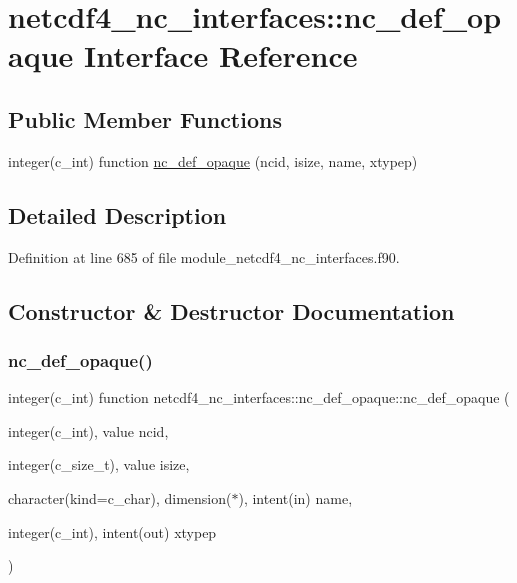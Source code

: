 \hypertarget{interfacenetcdf4__nc__interfaces_1_1nc__def__opaque}{}\section{netcdf4\+\_\+nc\+\_\+interfaces\+:\+:nc\+\_\+def\+\_\+opaque Interface Reference}
\label{interfacenetcdf4__nc__interfaces_1_1nc__def__opaque}
\subsection*{Public Member Functions}
\begin{DoxyCompactItemize}
\item 
integer(c\+\_\+int) function \hyperlink{interfacenetcdf4__nc__interfaces_1_1nc__def__opaque_aabdad01644937db10d68b7c102fb4693}{nc\+\_\+def\+\_\+opaque} (ncid, isize, name, xtypep)
\end{DoxyCompactItemize}


\subsection{Detailed Description}


Definition at line 685 of file module\+\_\+netcdf4\+\_\+nc\+\_\+interfaces.\+f90.



\subsection{Constructor \& Destructor Documentation}
\mbox{\label{interfacenetcdf4__nc__interfaces_1_1nc__def__opaque_aabdad01644937db10d68b7c102fb4693}} 
\subsubsection{\texorpdfstring{nc\+\_\+def\+\_\+opaque()}{nc\_def\_opaque()}}
{\footnotesize\ttfamily integer(c\+\_\+int) function netcdf4\+\_\+nc\+\_\+interfaces\+::nc\+\_\+def\+\_\+opaque\+::nc\+\_\+def\+\_\+opaque (\begin{DoxyParamCaption}\item[{integer(c\+\_\+int), value}]{ncid,  }\item[{integer(c\+\_\+size\+\_\+t), value}]{isize,  }\item[{character(kind=c\+\_\+char), dimension($\ast$), intent(in)}]{name,  }\item[{integer(c\+\_\+int), intent(out)}]{xtypep }\end{DoxyParamCaption})}



